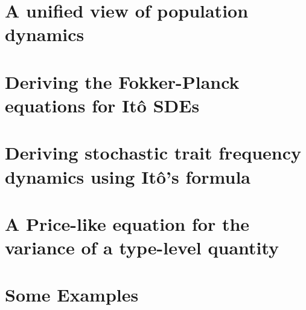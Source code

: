 \documentclass[twoside, 12pt]{iiser-thesis-modified}
\begin{document}
\chapter{A unified view of population dynamics}\label{chap_unification}


\cleardoublepage
{}
\appendix
{}

\renewcommand{\chaptername}{Appendix} 
\chapter{Deriving the Fokker-Planck equations for It\^{o} SDEs}\label{App_SDE_FPE}

\chapter{Deriving stochastic trait frequency dynamics using It\^{o}'s formula}\label{App_density_to_freq}

\chapter{A Price-like equation for the variance of a type-level quantity}\label{App_stoch_var_eqns}

\chapter{Some Examples}\label{App_examples}


\cleardoublepage
{}
\printbibliography
{}
\end{document}
